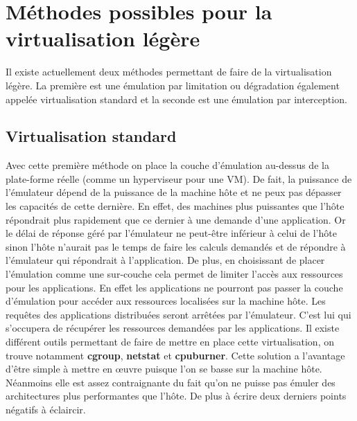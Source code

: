 \section{Méthodes possibles pour la virtualisation légère}
\label{section:emulation}

Il existe actuellement deux méthodes permettant de faire de la virtualisation
légère. La première est une émulation par limitation ou dégradation également
appelée virtualisation standard et la seconde est une émulation par
interception.

\subsection{Virtualisation standard}
Avec cette première méthode on place la couche d'émulation au-dessus de la
plate-forme réelle (comme un hyperviseur pour une VM). De fait, la puissance de
l'émulateur dépend de la puissance de la machine hôte et ne peux pas dépasser
les capacités de cette dernière. En effet, des machines plus puissantes que
l'hôte répondrait plus rapidement que ce dernier à une demande d'une
application. Or le délai de réponse géré par l'émulateur ne peut-être inférieur
à celui de l'hôte sinon l'hôte n'aurait pas le temps de faire les calculs
demandés et de répondre à l'émulateur qui répondrait à l'application. De plus,
en choisissant de placer l'émulation comme une sur-couche cela permet de limiter
l'accès aux ressources pour les applications. En effet les applications ne
pourront pas passer la couche d'émulation pour accéder aux ressources localisées
sur la machine hôte. Les requêtes des applications distribuées seront arrêtées
par l'émulateur. C'est lui qui s'occupera de récupérer les ressources demandées
par les applications. Il existe différent outils permettant de faire de mettre
en place cette virtualisation, on trouve notamment \textbf{cgroup},
\textbf{netstat} et \textbf{cpuburner}.  Cette solution a l'avantage d'être
simple à mettre en \oe uvre puisque l'on se basse sur la machine hôte. Néanmoins
elle est assez contraignante du fait qu'on ne puisse pas émuler des
architectures plus performantes que l'hôte. De plus {\color{red} à écrire deux
  derniers points négatifs à éclaircir}.

